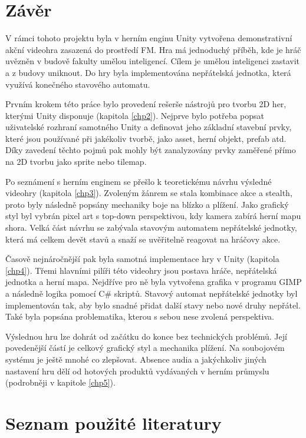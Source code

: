 \documentclass[FM,Proj,bw]{tulthesis}
\begin{document}
	\chapter{Závěr}
	
	V rámci tohoto projektu byla v herním enginu Unity vytvořena demonstrativní akční videohra zasazená do prostředí FM. Hra má jednoduchý příběh, kde je hráč uvězněn v budově fakulty umělou inteligencí. Cílem je umělou inteligenci zastavit a z budovy uniknout. Do hry byla implementována nepřátelská jednotka, která využívá konečného stavového automatu.
	
	Prvním krokem této práce bylo provedení rešerše nástrojů pro tvorbu 2D her, kterými Unity disponuje (kapitola \ref{chp2}). Nejprve bylo potřeba popsat uživatelské rozhraní samotného Unity a definovat jeho základní stavební prvky, které jsou používané při jakékoliv tvorbě, jako asset, herní objekt, prefab atd. Díky zavedení těchto pojmů pak mohly být zanalyzovány prvky zaměřené přímo na 2D tvorbu jako sprite nebo tilemap.
	
	Po seznámení s herním enginem se přešlo k teoretickému návrhu výsledné videohry (kapitola \ref{chp3}). Zvoleným žánrem se stala kombinace akce a stealth, proto byly následně popsány mechaniky boje na blízko a plížení. Jako grafický styl byl vybrán pixel art s top-down perspektivou, kdy kamera zabírá herní mapu shora. Velká část návrhu se zabývala stavovým automatem nepřátelské jednotky, která má celkem devět stavů a snaží se uvěřitelně reagovat na hráčovy akce.
	
	Časově nejnáročnější pak byla samotná implementace hry v Unity (kapitola \ref{chp4}). Třemi hlavními pilíři této videohry jsou postava hráče, nepřátelská jednotka a herní mapa. Nejdříve pro ně byla vytvořena grafika v programu GIMP a následně logika pomocí C\# skriptů. Stavový automat nepřátelské jednotky byl implementován tak, aby bylo snadné přidat další stavy nebo nové druhy nepřátel. Také byla popsána problematika, kterou s sebou nese zvolená perspektiva.
	
	Výslednou hru lze dohrát od začátku do konce bez technických problémů. Její povedenější částí je celkový grafický styl a mechanika plížení. Na soubojovém systému je ještě mnohé co zlepšovat. Absence audia a jakýchkoliv jiných nastavení hru dělí od hotových produktů vydávaných v herním průmyslu (podrobněji v kapitole \ref{chp5}).
	
	\chapter*{Seznam použité literatury}
	\printbibliography[heading=none]
	
\end{document}
